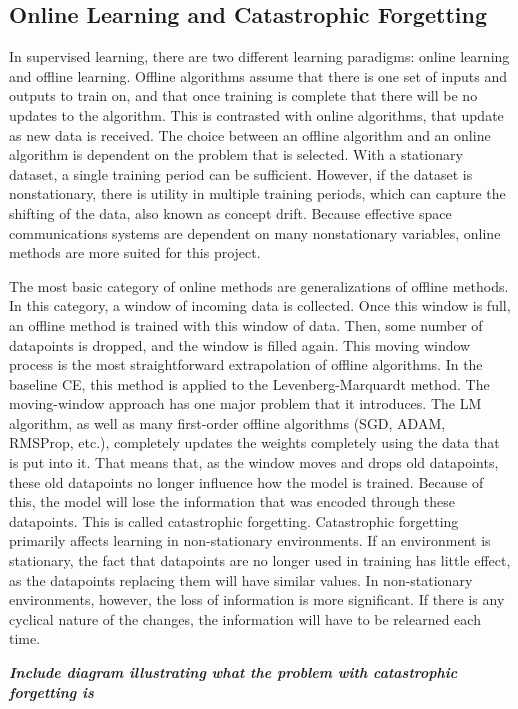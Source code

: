\documentclass[11pt]{report}
\begin{document}
	\subsection{Online Learning and Catastrophic Forgetting}
	\par In supervised learning, there are two different learning paradigms: online learning and offline learning. Offline algorithms assume that there is one set of inputs and outputs to train on, and that once training is complete that there will be no updates to the algorithm. This is contrasted with online algorithms, that update as new data is received. The choice between an offline algorithm and an online algorithm is dependent on the problem that is selected. With a stationary dataset, a single training period can be sufficient. However, if the dataset is nonstationary, there is utility in multiple training periods, which can capture the shifting of the data, also known as concept drift. Because effective space communications systems are dependent on many nonstationary variables, online methods are more suited for this project.
	\par The most basic category of online methods are generalizations of offline methods. In this category, a window of incoming data is collected. Once this window is full, an offline method is trained with this window of data. Then, some number of datapoints is dropped, and the window is filled again. This moving window process is the most straightforward extrapolation of offline algorithms. In the baseline CE, this method is applied to the Levenberg-Marquardt method. The moving-window approach has one major problem that it introduces. The LM algorithm, as well as many first-order offline algorithms (SGD, ADAM, RMSProp, etc.), completely updates the weights completely using the data that is put into it. That means that, as the window moves and drops old datapoints, these old datapoints no longer influence how the model is trained. Because of this, the model will lose the information that was encoded through these datapoints. This is called catastrophic forgetting.  Catastrophic forgetting primarily affects learning in non-stationary environments. If an environment is stationary, the fact that datapoints are no longer used in training has little effect, as the  datapoints replacing them will have similar values. In non-stationary environments, however, the loss of information is more significant. If there is any cyclical nature of the changes, the information will have to be relearned each time.
	\par \textbf{\textit{Include diagram illustrating what the problem with catastrophic forgetting is}}
\end{document}
